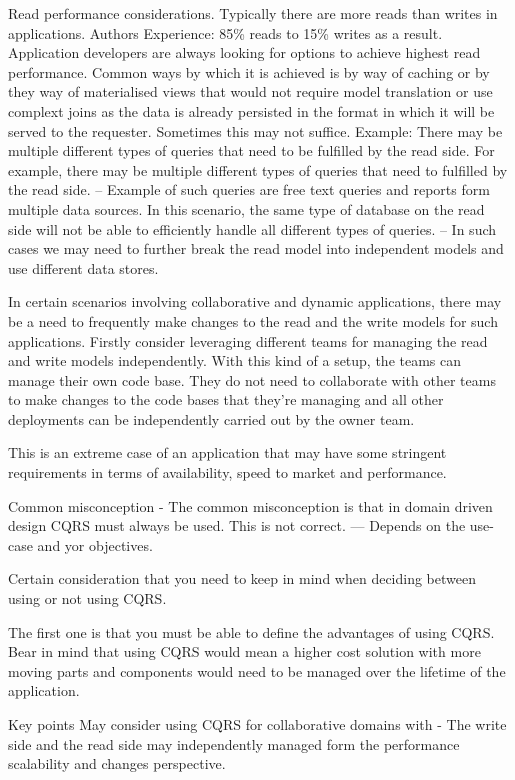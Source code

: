 Read performance considerations.
Typically there are more reads than writes in applications.
Authors Experience: 85\% reads to 15\% writes as a result.
Application developers are always looking for options to achieve highest read performance.
Common ways by which it is achieved is by way of caching or by they way of materialised views that would not require model translation or use complext joins as the data is already persisted in the format in which it will be served to the requester.
Sometimes this may not suffice.
Example:
There may be multiple different types of queries that need to be fulfilled by the read side.
For example, there may be multiple different types of queries that need to fulfilled by the read side.
-- Example of such queries are free text queries and reports form multiple data sources.
In this scenario, the same type of database on the read side will not be able to efficiently handle all different types of queries.
-- In such cases we may need to further break the read model into independent models and use different data stores.

In certain scenarios involving collaborative and dynamic applications, there may be a need to frequently make changes to the read and the write models for such applications.
Firstly consider leveraging different teams for managing the read and write models independently.
With this kind of a setup, the teams can manage their own code base.
They do not need to collaborate with other teams to make changes to the code bases that they're managing and all other deployments can be independently carried out by the owner team.

This is an extreme case of an application that may have some stringent requirements in terms of availability, speed to market and performance.

Common misconception
- The common misconception is that in domain driven design CQRS must always be used. This is not correct.
--- Depends on the use-case and yor objectives.

Certain consideration that you need to keep in mind when deciding between using or not using CQRS.

The first one is that you must be able to define the advantages of using CQRS.
Bear in mind that using CQRS would mean a higher cost solution with more moving parts and components would need to be managed over the lifetime of the application.

Key points
May consider using CQRS for collaborative domains with
- The write side and the read side may independently managed form the performance scalability and changes perspective.

